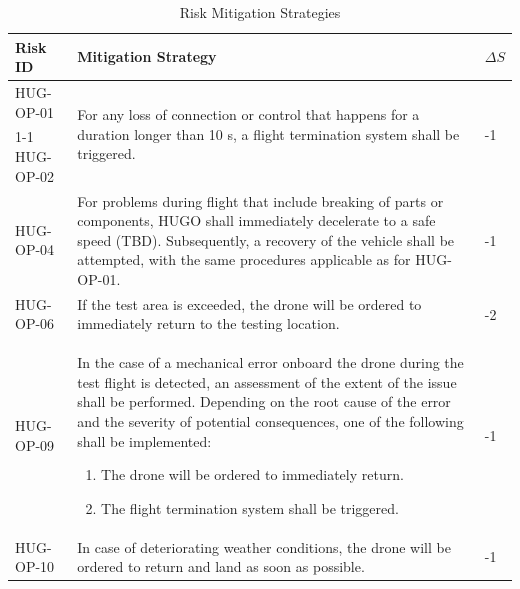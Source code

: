 \begin{table}[H]
   \caption{Risk Mitigation Strategies}
    \centering
    \begin{tabular}{|p{2.5cm}|p{11cm}|p{0.75cm}|}
    \hline
        \textbf{Risk ID} & \textbf{Mitigation Strategy} & $\Delta S$ \\ 
        \hline\hline
        HUG-OP-01 & \multirow{2}{*}{\parbox{11cm}{For any loss of connection or control that happens for a duration longer than 10 s, a flight termination system shall be triggered.}} & \multirow{2}{*}{-1} \\ 
        \cline{1-1}
        HUG-OP-02 & & \\ 
        \hline
        HUG-OP-04 & For problems during flight that include breaking of parts or components, HUGO shall immediately decelerate to a safe speed (TBD). Subsequently, a recovery of the vehicle shall be attempted, with the same procedures applicable as for HUG-OP-01. & -1 \\ 
        \hline
        HUG-OP-06 & If the test area is exceeded, the drone will be ordered to immediately return to the testing location. & -2 \\ \hline
        HUG-OP-09 & In the case of a mechanical error onboard the drone during the test flight is detected, an assessment of the extent of the issue shall be performed. Depending on the root cause of the error and the severity of potential consequences, one of the following shall be implemented:
        \begin{enumerate}
        \item The drone will be ordered to immediately return. 
        \item The flight termination system shall be triggered. 
        \end{enumerate} 
        & -1 \\ \hline
        HUG-OP-10 & In case of deteriorating weather conditions, the drone will be ordered to return and land as soon as possible. & -1 \\ \hline
        
    \end{tabular}
    \label{tab:risk_mitigation_scenarios}
\end{table}



